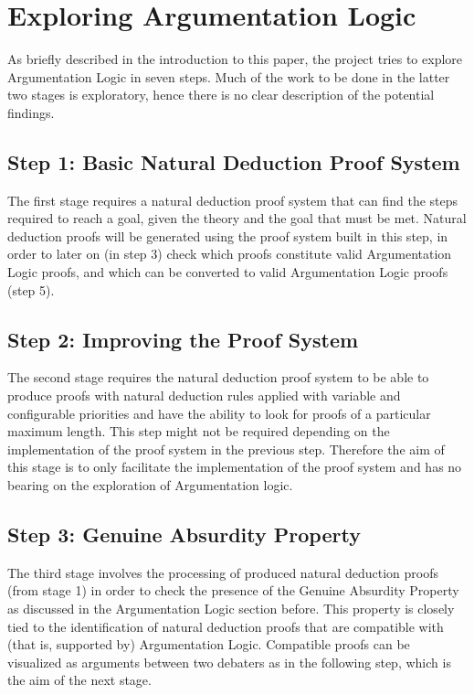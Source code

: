 \documentclass[11pt,twoside,a4paper]{report}
\begin{document}
\section{Exploring Argumentation Logic}
As briefly described in the introduction to this paper, the project tries to explore Argumentation Logic in seven steps. Much of the work to be done in the latter two stages is exploratory, hence there is no clear description of the potential findings.

\subsection{Step 1: Basic Natural Deduction Proof System}
The first stage requires a natural deduction proof system that can find the steps required to reach a goal, given the theory and the goal that must be met. Natural deduction proofs will be generated using the proof system built in this step, in order to later on (in step 3) check which proofs constitute valid Argumentation Logic proofs, and which can be converted to valid Argumentation Logic proofs (step 5).

\subsection{Step 2: Improving the Proof System}
The second stage requires the natural deduction proof system to be able to produce proofs with natural deduction rules applied with variable and configurable priorities and have the ability to look for proofs of a particular maximum length. This step might not be required depending on the implementation of the proof system in the previous step. Therefore the aim of this stage is to only facilitate the implementation of the proof system and has no bearing on the exploration of Argumentation logic.

\subsection{Step 3: Genuine Absurdity Property}
The third stage involves the processing of produced natural deduction proofs (from stage 1) in order to check the presence of the Genuine Absurdity Property as discussed in the Argumentation Logic section before. This property is closely tied to the identification of natural deduction proofs that are compatible with (that is, supported by) Argumentation Logic. Compatible proofs can be visualized as arguments between two debaters as in the following step, which is the aim of the next stage.
\end{document}

